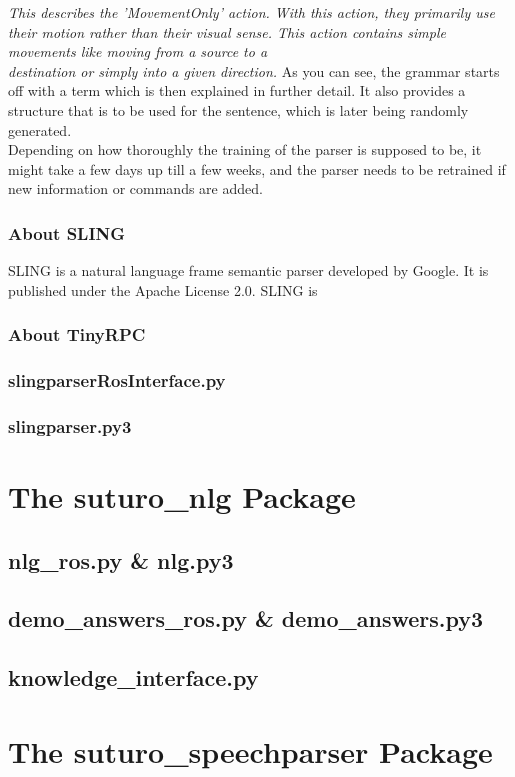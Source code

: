\documentclass[main.tex]{subfiles}
\begin{document}
            \textit{This describes the 'MovementOnly' action.
                With this action, they primarily use their motion rather than their visual sense. This action contains simple movements like moving from a source to a\\ destination or simply into a given direction.}            
            As you can see, the grammar starts off with a term which is then explained in further detail. It also provides a structure that is to be used for the sentence, which is later being randomly generated.\\ 
            Depending on how thoroughly the training of the parser is supposed to be, it might take a few days up till a few weeks, and the parser needs to be retrained if new information or commands are added.
        
        \subsubsection{About SLING}
            SLING is a natural language frame semantic parser developed by Google. It is published under the Apache License 2.0. SLING is  
        \subsubsection{About TinyRPC}
        \subsubsection{slingparserRosInterface.py}
        \subsubsection{slingparser.py3}
    
    
\section{The suturo\_nlg Package}
    \subsection{nlg\_ros.py \& nlg.py3}
    \subsection{demo\_answers\_ros.py \& demo\_answers.py3}
    \subsection{knowledge\_interface.py}
    
\section{The suturo\_speechparser Package}
     
    	
\end{document}
